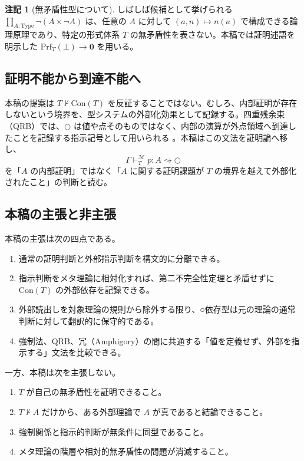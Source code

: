 \documentclass[a4paper,11pt]{ltjsarticle}
\theoremstyle{definition}
\newtheorem{remark}[definition]{注記}
\theoremstyle{plain}
\newcommand{\dfix}{\bigcirc}
\newcommand{\Prf}{\mathrm{Prf}}
\newcommand{\Con}{\mathrm{Con}}
\newcommand{\Meta}{\mathcal{M}}
\newcommand{\False}{\mathbf{0}}
\newcommand{\Type}{\mathrm{Type}}
\begin{document}
\begin{remark}[無矛盾性型について]
しばしば候補として挙げられる $\prod_{A:\Type}\neg(A\times\neg A)$ は、任意の $A$ に対して $(a,n)\mapsto n(a)$ で構成できる論理原理であり、特定の形式体系 $T$ の無矛盾性を表さない。本稿では証明述語を明示した $\Prf_T(\bot)\to\False$ を用いる。
\end{remark}

\subsection{証明不能から到達不能へ}

本稿の提案は $T\nvdash\Con(T)$ を反証することではない。むしろ、内部証明が存在しないという境界を、型システムの外部化効果として記録する。四重残余束（QRB）では、$\dfix$ は値や点そのものではなく、内部の演算が外点領域へ到達したことを記録する指示記号として用いられる \cite{ChibaQRB2026}。本稿はこの文法を証明論へ移し、
\[
 \Gamma\vdash^{\Meta}_T p:A\rightsquigarrow\dfix
\]
を「$A$ の内部証明」ではなく「$A$ に関する証明課題が $T$ の境界を越えて外部化されたこと」の判断と読む。

\subsection{本稿の主張と非主張}

本稿の主張は次の四点である。
\begin{enumerate}
 \item 通常の証明判断と外部指示判断を構文的に分離できる。
 \item 指示判断をメタ理論に相対化すれば、第二不完全性定理と矛盾せずに $\Con(T)$ の外部依存を記録できる。
 \item 外部読出しを対象理論の規則から除外する限り、○依存型は元の理論の通常判断に対して翻訳的に保守的である。
 \item 強制法、QRB、冗（Amphigory）の間に共通する「値を定義せず、外部を指示する」文法を比較できる。
\end{enumerate}

一方、本稿は次を主張しない。
\begin{enumerate}
 \item $T$ が自己の無矛盾性を証明できること。
 \item $T\nvdash A$ だけから、ある外部理論で $A$ が真であると結論できること。
 \item 強制関係と指示的判断が無条件に同型であること。
 \item メタ理論の階層や相対的無矛盾性の問題が消滅すること。
\end{enumerate}
\end{document}
